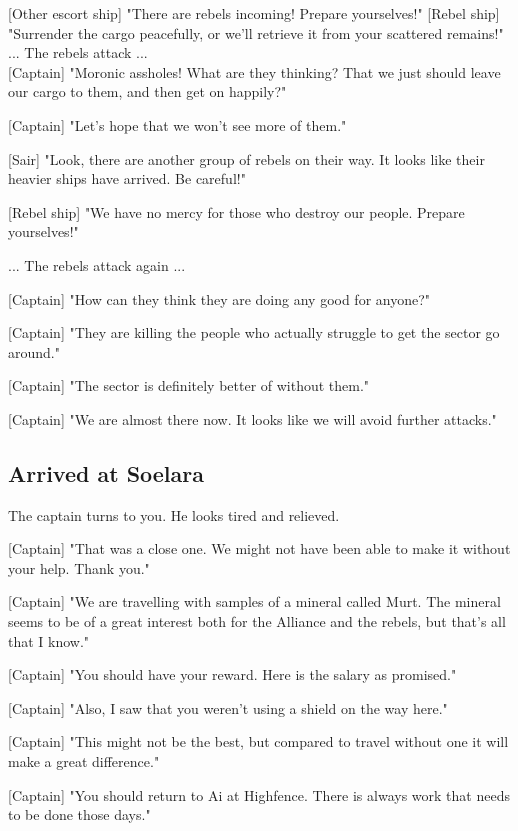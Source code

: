 \documentclass[a4paper,12pt]{article}
\begin{document}
[Other escort ship] "There are rebels incoming! Prepare yourselves!"
[Rebel ship] "Surrender the cargo peacefully, or we'll retrieve it from
your scattered remains!"\\

... The rebels attack ...\\

[Captain] "Moronic assholes! What are they thinking? That we just should leave
our cargo to them, and then get on happily?" 

[Captain] "Let's hope that we won't see more of them."

[Sair] "Look, there are another group of rebels on their way. It looks like
their heavier ships have arrived. Be careful!"

[Rebel ship] "We have no mercy for those who destroy our people. 
Prepare yourselves!"

... The rebels attack again ...

[Captain] "How can they think they are doing any good for anyone?" 

[Captain] "They are killing the people who actually struggle to get the sector go around."

[Captain] "The sector is definitely better of without them."

[Captain] "We are almost there now. It looks like we will avoid further attacks."

\subsection{Arrived at Soelara}

The captain turns to you. He looks tired and relieved. 

[Captain] "That was a close one. We might not have been able to make it without your help. 
Thank you."

[Captain] "We are travelling with samples of a mineral called Murt. The mineral seems to be of a great
interest both for the Alliance and the rebels, but that's all that I know."

[Captain] "You should have your reward. Here is the salary as promised."
 
[Captain] "Also, I saw that you weren't using a shield on the way here."

[Captain] "This might not be the best, but compared to travel without one it will make a great difference."

[Captain] "You should return to Ai at Highfence. There is always work that needs to be done those days."
\end{document}
